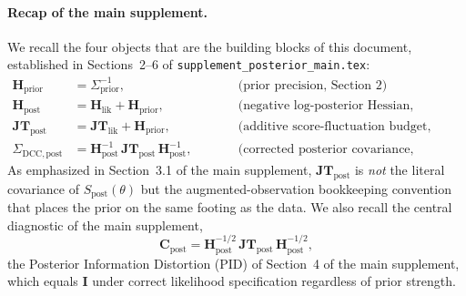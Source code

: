 \documentclass[11pt]{article}
\begin{document}
\paragraph{Recap of the main supplement.}
We recall the four objects that are the building blocks of this document, established in Sections~2--6 of \texttt{supplement\_posterior\_main.tex}:
\begin{align}
\mathbf H_{\mathrm{prior}}
&= \Sigma_{\mathrm{prior}}^{-1},
\qquad &&\text{(prior precision, Section~2)}
\label{eq:recap-hprior}\\
\mathbf H_{\mathrm{post}}
&= \mathbf H_{\mathrm{lik}} + \mathbf H_{\mathrm{prior}},
\qquad &&\text{(negative log-posterior Hessian, Section~2)}
\label{eq:recap-hpost}\\
\mathbf{JT}_{\mathrm{post}}
&= \mathbf{JT}_{\mathrm{lik}} + \mathbf H_{\mathrm{prior}},
\qquad &&\text{(additive score-fluctuation budget, Section~3.1)}
\label{eq:recap-jt}\\
\Sigma_{\mathrm{DCC},\mathrm{post}}
&= \mathbf H_{\mathrm{post}}^{-1}\, \mathbf{JT}_{\mathrm{post}}\, \mathbf H_{\mathrm{post}}^{-1},
\qquad &&\text{(corrected posterior covariance, Section~6).}
\label{eq:recap-dcc}
\end{align}
As emphasized in Section~3.1 of the main supplement, $\mathbf{JT}_{\mathrm{post}}$ is \emph{not} the literal covariance of $S_{\mathrm{post}}(\theta)$ but the augmented-observation bookkeeping convention that places the prior on the same footing as the data. We also recall the central diagnostic of the main supplement,
\begin{equation}
\mathbf C_{\mathrm{post}}
=
\mathbf H_{\mathrm{post}}^{-1/2}\,
\mathbf{JT}_{\mathrm{post}}\,
\mathbf H_{\mathrm{post}}^{-1/2},
\label{eq:recap-cpost}
\end{equation}
the Posterior Information Distortion (PID) of Section~4 of the main supplement, which equals $\mathbf I$ under correct likelihood specification regardless of prior strength.
\end{document}
